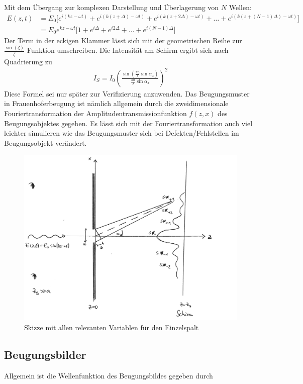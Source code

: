 \documentclass[a4paper]{article}
\begin{document}
Mit dem Übergang zur komplexen Darstellung und Überlagerung von $N$ Wellen:
\begin{align}
E(z,t) &= E_0 \Big[ e^{i(k z-\omega t)} + e^{i(k (z+\Delta)-\omega t)} + e^{i(k (z+2\Delta)-\omega t)} + \dots + e^{i(k (z+(N-1)\Delta)-\omega t)} \Big] \\
&= E_0  e^{k z-\omega t} \Big[ 1 +e^{i\Delta} + e^{i2\Delta} + \dots + e^{i(N-1)\Delta}\Big]
\end{align}
Der Term in der eckigen Klammer lässt sich mit der geometrischen Reihe zur $\frac{\sin(\zeta)}{\zeta}$ Funktion umschreiben.
Die Intensität am Schirm ergibt sich nach Quadrierung zu 
\begin{align}
I_S = I_0 \left( \frac{\sin\left(\frac{\pi a}{\lambda}\sin \alpha_x\right)}{\frac{\pi a}{\lambda} \sin \alpha_x} \right)^2
\label{eq:einzelspalt_vorueberlegung}
\end{align}
Diese Formel sei nur später zur Verifizierung anzuwenden. Das Beugungsmuster in Frauenhoferbeugung ist nämlich allgemein durch die zweidimensionale Fouriertransformation der Amplitudentransmissionfunktion $f(z,x)$ des Beugungsobjektes gegeben. Es lässt sich mit der Fouriertransformation auch viel leichter simulieren wie das Beugungsmuster sich bei Defekten/Fehlstellen im Beugungsobjekt verändert.
\begin{figure}[!htb]
\centering
\includegraphics[width=\textwidth]{einzelspalt.pdf}
\caption{Skizze mit allen relevanten Variablen für den Einzelspalt}
\end{figure}

\subsection{Beugungsbilder}
Allgemein ist die Wellenfunktion des Beugungsbildes gegeben durch
\end{document}
